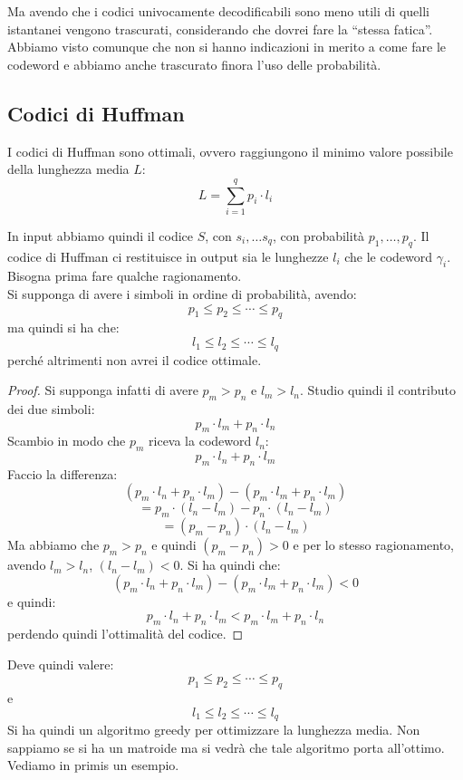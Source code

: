 \documentclass[a4paper,12pt, oneside]{book}
\begin{document}
Ma avendo che i codici univocamente decodificabili sono meno utili di quelli
istantanei vengono trascurati, considerando che dovrei fare la ``stessa
fatica''.\\
Abbiamo visto comunque che non si hanno indicazioni in merito a come fare le
codeword e abbiamo anche trascurato finora l'uso delle probabilità.
\subsection{Codici di Huffman}
I codici di Huffman sono ottimali, ovvero raggiungono il minimo valore possibile
della lunghezza media $L$:
\[L=\sum_{i=1}^q p_i\cdot l_i\]
\begin{teorema}
  In input abbiamo quindi il codice $S$, con $s_i,\ldots s_q$, con probabilità
  $p_1,\ldots, p_q$. Il codice di Huffman ci restituisce in output sia le
  lunghezze $l_i$ che le codeword $\gamma_i$.\\
  Bisogna prima fare qualche ragionamento.\\
  Si supponga di avere i simboli in ordine di probabilità, avendo:
  \[p_1\leq p_2\leq \cdots\leq p_q\]
  ma quindi si ha che:
  \[l_1\leq l_2\leq \cdots \leq l_q\]
  perché altrimenti non avrei il codice ottimale.
\end{teorema}
\begin{proof}
  Si supponga infatti di avere
  $p_m>p_n$ e $l_m>l_n$. Studio quindi il contributo dei due simboli:
  \[p_m\cdot l_m+p_n\cdot l_n\]
  Scambio in modo che $p_m$ riceva la codeword $l_n$:
  \[p_m\cdot l_n+p_n\cdot l_m\]
  Faccio la differenza:
  \[(p_m\cdot l_n+p_n\cdot l_m)-(p_m\cdot l_m+p_n\cdot l_m)\]
  \[=p_m\cdot (l_n-l_m)-p_n\cdot (l_n-l_m)\]
  \[=(p_m-p_n)\cdot(l_n-l_m)\]
  Ma abbiamo che $p_m>p_n$ e quindi $(p_m-p_n)>0$ e per lo stesso ragionamento,
  avendo $l_m>l_n$, $(l_n-l_m)<0$. Si ha quindi che:
  \[(p_m\cdot l_n+p_n\cdot l_m)-(p_m\cdot l_m+p_n\cdot l_m)<0\]
  e quindi:
  \[p_m\cdot l_n+p_n\cdot l_m<p_m\cdot l_m+p_n\cdot l_n\]
  perdendo quindi l'ottimalità del codice. 
\end{proof}
Deve quindi valere:
\[p_1\leq p_2\leq \cdots\leq p_q\]
e
\[l_1\leq l_2\leq \cdots \leq l_q\]
Si ha quindi un algoritmo greedy per ottimizzare la lunghezza media. Non
sappiamo se si ha un matroide ma si vedrà che tale algoritmo porta
all'ottimo. Vediamo in primis un esempio.
\end{document}
